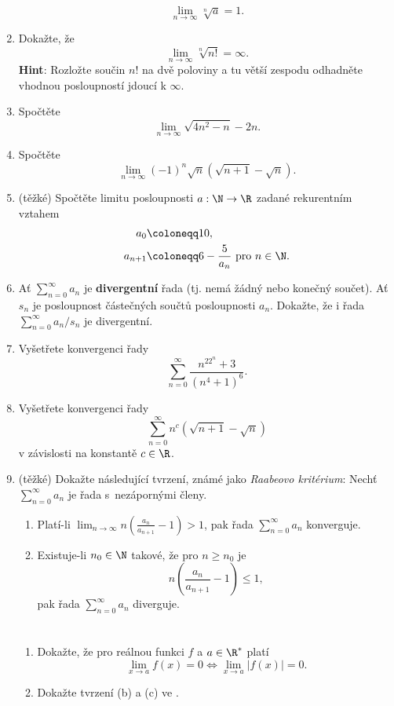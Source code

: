 \begin{enumerate}
  \[
   \lim_{n \to \infty} \sqrt[n]{a} = 1.
  \]
 \item Dokažte, že
  \[
   \lim_{n \to \infty} \sqrt[n]{n!} = \infty.
  \]
  \textbf{Hint}: Rozložte součin $n!$ na dvě poloviny a tu větší zespodu
  odhadněte vhodnou posloupností jdoucí k $\infty$.
 \item Spočtěte
  \[
   \lim_{n \to \infty} \sqrt{4n^2 - n} - 2n.
  \]
 \item Spočtěte
  \[
   \lim_{n \to \infty} (-1)^{n}\sqrt{n}(\sqrt{n+1}-\sqrt{n}).
  \]
 \item (těžké) Spočtěte limitu posloupnosti $a:\N \to \R$ zadané rekurentním
  vztahem
  \begin{align*}
   a_0 &\coloneqq 10,\\
   a_{n+1} & \coloneqq 6 - \frac{5}{a_n} \text{ pro } n \in \N.
  \end{align*}
 \item Ať $\sum_{n = 0}^{\infty} a_n$ je \textbf{divergentní} řada (tj. nemá
  žádný nebo konečný součet). Ať $s_n$ je posloupnost částečných součtů
  posloupnosti $a_n$. Dokažte, že i řada $\sum_{n = 0}^{\infty} a_n / s_n$ je
  divergentní.
 \item Vyšetřete konvergenci řady
  \[
   \sum_{n=0}^{\infty} \frac{n^22^{n}+3}{(n^{4}+1)^{6}}.
  \]
 \item Vyšetřete konvergenci řady
  \[
   \sum_{n = 0}^{\infty} n^{c}(\sqrt{n+1}-\sqrt{n})
  \]
  v závislosti na konstantě $c \in \R$.
 \item (těžké) Dokažte následující tvrzení, známé jako \emph{Raabeovo
  kritérium}: Nechť $\sum_{n = 0}^{\infty} a_n$ je řada s~nezápornými členy.
  \begin{enumerate}[label=(\alph*)]
   \item Platí-li $\lim_{n \to \infty} n \left( \frac{a_n}{a_{n+1}} - 1 \right) >
    1$, pak řada $\sum_{n = 0}^{\infty} a_n$ konverguje.
   \item Existuje-li $n_0 \in \N$ takové, že pro $n \geq n_0$ je
   \[
    n \left( \frac{a_n}{a_{n+1}} - 1 \right) \leq 1,
   \]
   pak řada $\sum_{n = 0}^{\infty} a_n$ diverguje.
  \end{enumerate}

\section*{}

 \begin{enumerate}
  \item Dokažte, že pro reálnou funkci $f$ a $a \in \R^{*}$ platí
   \[
    \lim_{x \to a} f(x) = 0 \Leftrightarrow \lim_{x \to a} |f(x)| = 0.
   \]
  \item Dokažte tvrzení (b) a (c) ve .
 \end{enumerate}
\end{enumerate}
